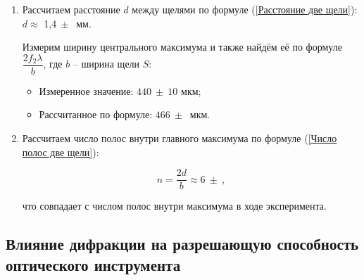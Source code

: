 \documentclass[a4paper, 12pt]{article}
\begin{document}
\begin{enumerate}
	\item Рассчитаем расстояние $d$ между щелями по формуле (\ref{Расстояние две щели}): $d \approx$ 1,4$~\pm~$ мм.

	Измерим ширину центрального максимума и также найдём её по формуле $\dfrac{2f_2\lambda}{b}$, где $b$ -- ширина щели $S$:
	\begin{itemize}
		\item Измеренное значение: $440~\pm~10$ мкм;
		\item Рассчитанное по формуле: $466~\pm~$ мкм.
	\end{itemize}

\item Рассчитаем число полос внутри главного максимума по формуле (\ref{Число полос две щели}):

\[n = \dfrac{2d}{b} \approx 6~\pm~,\]

что совпадает с числом полос внутри максимума в ходе эксперимента.
\end{enumerate}

\subsection{Влияние дифракции на разрешающую способность оптического инструмента}
\end{document}
